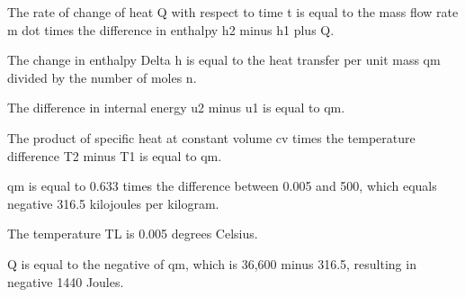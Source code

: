 The rate of change of heat Q with respect to time t is equal to the mass flow rate m dot times the difference in enthalpy h2 minus h1 plus Q.

The change in enthalpy Delta h is equal to the heat transfer per unit mass qm divided by the number of moles n.

The difference in internal energy u2 minus u1 is equal to qm.

The product of specific heat at constant volume cv times the temperature difference T2 minus T1 is equal to qm.

qm is equal to 0.633 times the difference between 0.005 and 500, which equals negative 316.5 kilojoules per kilogram.

The temperature TL is 0.005 degrees Celsius.

Q is equal to the negative of qm, which is 36,600 minus 316.5, resulting in negative 1440 Joules.